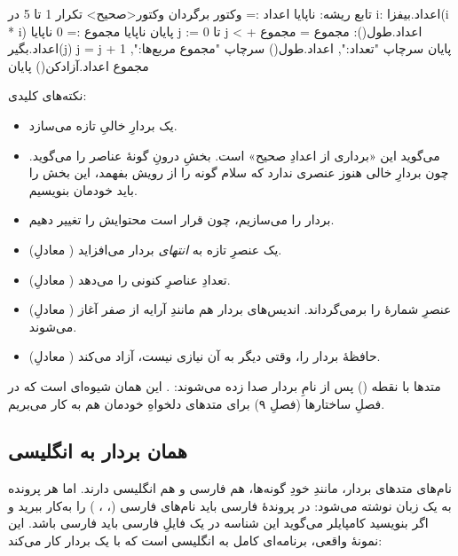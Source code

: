 \begin{salamfa}
تابع ریشه:
    ناپایا اعداد := وکتور {} برگردان وکتور<صحیح>
    تکرار 1 تا 5 در i:
        اعداد.بیفزا(i * i)
    پایان
    ناپایا مجموع := 0
    ناپایا j := 0
    تا j < اعداد.طول():
        مجموع = مجموع + اعداد.بگیر(j)
        j = j + 1
    پایان
    سرچاپ "تعداد:", اعداد.طول()
    سرچاپ "مجموع مربع‌ها:", مجموع
    اعداد.آزادکن()
پایان
\end{salamfa}

نکته‌های کلیدی:
\begin{itemize}
  \item {} یک بردارِ خالیِ تازه می‌سازد.
  \item {} می‌گوید این «برداری از اعدادِ صحیح» است.
        بخشِ درونِ \code{<\,>} گونهٔ عناصر را می‌گوید. چون بردارِ خالی هنوز
        عنصری ندارد که سلام گونه را از رویش بفهمد، این بخش را باید خودمان
        بنویسیم.
  \item بردار را  می‌سازیم، چون قرار است محتوایش را تغییر دهیم.
  \item {} (معادلِ ) یک عنصرِ تازه به \emph{انتهای}
        بردار می‌افزاید.
  \item {} (معادلِ ) تعدادِ عناصرِ کنونی را می‌دهد.
  \item {} (معادلِ ) عنصرِ شمارهٔ  را
        برمی‌گرداند. اندیس‌های بردار هم مانندِ آرایه از صفر آغاز می‌شوند.
  \item {} (معادلِ ) حافظهٔ بردار را، وقتی دیگر
        به آن نیازی نیست، آزاد می‌کند.
\end{itemize}

\begin{note}
متدها با نقطه () پس از نامِ بردار صدا زده می‌شوند:
. این همان شیوه‌ای است که در فصلِ ساختارها (فصلِ ۹) برای
متدهای دلخواهِ خودمان هم به کار می‌بریم.
\end{note}

\subsection{همان بردار به انگلیسی}

نام‌های متدهای بردار، مانندِ خودِ گونه‌ها، هم فارسی و هم انگلیسی دارند. اما
هر پرونده به یک زبان نوشته می‌شود: در پروندهٔ فارسی باید نام‌های فارسی
(، ، ) را به‌کار ببرید و اگر بنویسید
 کامپایلر می‌گوید این شناسه در یک فایلِ فارسی باید فارسی باشد. این
نمونهٔ واقعی، برنامه‌ای کامل به انگلیسی است که با یک بردار کار می‌کند:

